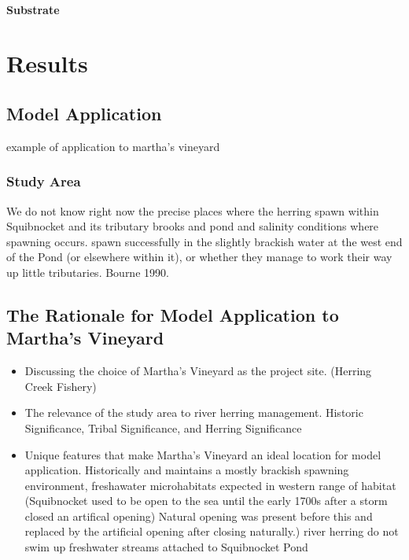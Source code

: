 \documentclass[
]{book}
\providecommand{\tightlist}{%
  \setlength{\itemsep}{0pt}\setlength{\parskip}{0pt}}
\begin{document}
\hypertarget{substrate-8}{%
\subsubsection{Substrate}\label{substrate-8}}

\hypertarget{results}{%
\chapter{Results}\label{results}}

\hypertarget{model-application}{%
\section{Model Application}\label{model-application}}

example of application to martha's vineyard

\hypertarget{study-area}{%
\subsection{Study Area}\label{study-area}}

We do not know right now the precise
places where the herring spawn within Squibnocket
and its tributary brooks and pond and salinity conditions where spawning occurs. spawn successfully in the slightly brackish water
at the west end of the Pond (or elsewhere within
it), or whether they manage to work their way up
little tributaries. Bourne 1990.

\hypertarget{the-rationale-for-model-application-to-marthas-vineyard}{%
\section{The Rationale for Model Application to Martha's Vineyard}\label{the-rationale-for-model-application-to-marthas-vineyard}}

\begin{itemize}
\tightlist
\item
  Discussing the choice of Martha's Vineyard as the project site.
  (Herring Creek Fishery)
\item
  The relevance of the study area to river herring management.
  Historic Significance, Tribal Significance, and Herring Significance
\item
  Unique features that make Martha's Vineyard an ideal location for model application.
  Historically and maintains a mostly brackish spawning environment, freshawater microhabitats expected in western range of habitat
  (Squibnocket used to be open to the sea until the early 1700s after a storm closed an artifical opening) Natural opening was present before this and replaced by the artificial opening after closing naturally.)
  river herring do not swim up freshwater streams attached to Squibnocket Pond
\end{itemize}
\end{document}
